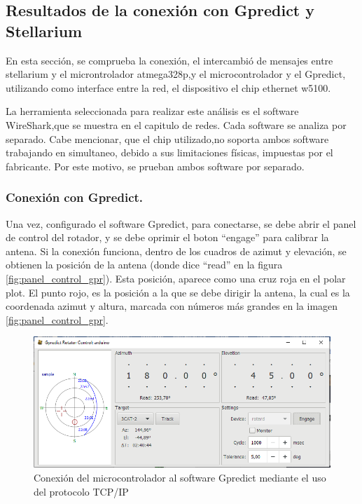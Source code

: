 \subsection{Resultados de la conexión con Gpredict y Stellarium} 

En esta sección, se comprueba la conexión, el intercambió de mensajes entre stellarium y el microntrolador atmega328p,y el microcontrolador y el Gpredict, utilizando como interface entre la red, el dispositivo el chip ethernet w5100. 

La herramienta seleccionada para realizar este análisis es el software WireShark,que se muestra en el capitulo de redes. Cada software se analiza por separado. Cabe mencionar, que el chip utilizado,no soporta ambos software trabajando en simultaneo, debido a sus limitaciones físicas, impuestas por el fabricante. Por este motivo, se prueban ambos software por separado. 

\subsubsection{Conexión con Gpredict.} 

Una vez, configurado el software Gpredict, para conectarse, se debe abrir el panel de control del rotador, y se debe oprimir el boton ``engage'' para calibrar la antena. Si la conexión funciona, dentro de los cuadros de azimut y elevación, se obtienen la posición de la antena (donde dice ``read'' en la figura \ref{fig:panel_control_gpr}). Esta posición, aparece como una cruz roja en el polar plot. El punto rojo, es la posición a la que se debe dirigir la antena, la cual es la coordenada azimut y altura, marcada con números más grandes en la imagen \ref{fig:panel_control_gpr}. 


\begin{figure}[ht]
	\includegraphics[scale=0.7]{gpred_rotador} 
	\caption{Conexión del microcontrolador al software Gpredict mediante el uso del protocolo TCP/IP} 
	\label{fig:prueba_gpredict_1} 
\end{figure}

